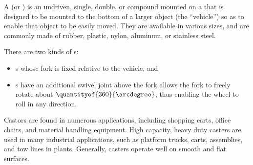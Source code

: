 \begin{module}[id=castor]
  \begin{definition}
    A  (or ) is an undriven, single, double, or compound
     mounted on a  that is designed to be mounted to the
    bottom of a larger object (the ``vehicle'') so as to enable that object to be easily
    moved. They are available in various sizes, and are commonly made of rubber, plastic,
    nylon, aluminum, or stainless steel.

    There are two kinds of s:
  \begin{itemize}
  \item {}s whose fork is fixed relative to the vehicle, and 
  \item {}s have an additional swivel joint above the fork allows the
    fork to freely rotate about $\quantityof{360}{\arcdegree}$, thus enabling the wheel to
    roll in any direction.
\end{itemize}
\end{definition}

\begin{omtext}
  Castors are found in numerous applications, including shopping carts, office chairs, and
  material handling equipment. High capacity, heavy duty casters are used in many
  industrial applications, such as platform trucks, carts, assemblies, and tow lines in
  plants. Generally, casters operate well on smooth and flat surfaces.
\end{omtext}
\end{module}
